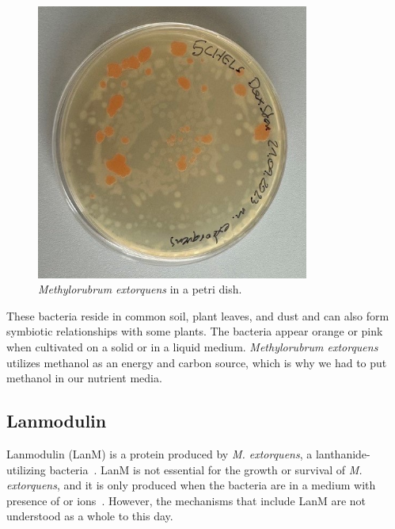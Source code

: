 \begin{figure}[H]
    \centering
    \includegraphics[width=0.8\textwidth]{./media/images/mextorquens_petri_dish}
    \caption{\emph{Methylorubrum extorquens} in a petri dish.}
    \label{fig:mextorquens_petri_dish}
\end{figure}

These bacteria reside in common soil, plant leaves, and dust and can also form symbiotic
relationships with some plants.
The bacteria appear orange or pink when cultivated on a solid or in a liquid medium.
\emph{Methylorubrum extorquens} utilizes methanol as an energy
and carbon source, which is why we had to put methanol in our nutrient media.

\subsection{Lanmodulin\authorA}

Lanmodulin (LanM) is a protein produced by \textit{M. extorquens}, a lanthanide-utilizing bacteria~\cite{lanmdiscovery}.
LanM is not essential for the growth or survival of \textit{M. extorquens}, and it is only produced when the bacteria are in a medium with presence of  or  ions~\cite{lanmroleinbiology}.
However, the mechanisms that include LanM are not understood as a whole to this day.

